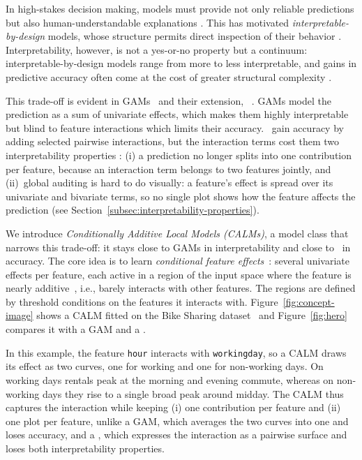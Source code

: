 In high-stakes decision making, models must provide not only reliable predictions but also human-understandable explanations \cite{murdoch2019interpretable, doshi2017towards}. 
This has motivated \emph{interpretable-by-design} models, whose structure permits direct inspection of their behavior \cite{rudin2019stop, molnar2020interpretable}.
Interpretability, however, is not a yes-or-no property but a continuum: interpretable-by-design models range from more to less interpretable, and gains in predictive accuracy often come at the cost of greater structural complexity \cite{lipton2018mythos, Hammann2025xVSacc}.



This trade-off is evident in GAMs~\cite{lou2012intelligible} and their extension, \gamms~\cite{lou2013accurate, caruana2015intelligible}.
GAMs model the prediction as a sum of univariate effects, which makes them highly interpretable but blind to feature interactions which limits their accuracy.
\gamms~gain accuracy by adding selected pairwise interactions, but the interaction terms cost them two interpretability properties \cite{radenovic2022neural, xiong2026neural}:
(i) a prediction no longer splits into one contribution per feature, because an interaction term belongs to two features jointly, and
(ii)~global auditing is hard to do visually: a feature's effect is spread over its univariate and bivariate terms, so no single plot shows how the feature affects the prediction (see Section~\ref{subsec:interpretability-properties}).

We introduce \emph{Conditionally Additive Local Models (CALMs)}, a model class that narrows this trade-off: it stays close to GAMs in interpretability and close to \gamms~in accuracy.
The core idea is to learn \emph{conditional feature effects}~\cite{hastie1993varying, berger2019tree}: several univariate effects per feature, each active in a region of the input space where the feature is nearly additive~\cite{hooker2004discovering}, i.e., barely interacts with other features.
The regions are defined by threshold conditions on the features it interacts with.
Figure~\ref{fig:concept-image} shows a CALM fitted on the Bike Sharing dataset~\cite{fanaee2014event} and Figure~\ref{fig:hero} compares it with a GAM and a \gamm.

In this example, the feature \texttt{hour} interacts with \texttt{workingday}, so a CALM draws its effect as two curves, one for working and one for non-working days.
On working days rentals peak at the morning and evening commute, whereas on non-working days they rise to a single broad peak around midday.
The CALM thus captures the interaction while keeping (i) one contribution per feature and (ii) one plot per feature, unlike a GAM, which averages the two curves into one and loses accuracy, and a \gamm{}, which expresses the interaction as a pairwise surface and loses both interpretability properties.

